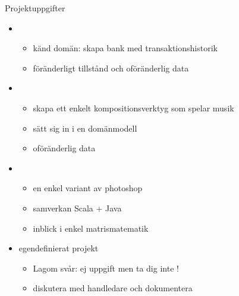 \begin{Slide}{Projektuppgifter}\SlideFontTiny

\begin{itemize}\SlideFontTiny
\item {}
\begin{itemize}\SlideFontTiny
\item känd domän: skapa bank med transaktionshistorik 
\item föränderligt tillstånd och oföränderlig data
\end{itemize}

\item {}
\begin{itemize}\SlideFontTiny
\item skapa ett enkelt kompositionsverktyg som spelar musik
\item sätt sig in i en domänmodell
\item oföränderlig data
\end{itemize}

\item {} 
\begin{itemize}\SlideFontTiny
\item en enkel variant av photoshop
\item samverkan Scala + Java
\item inblick i enkel matrismatematik
\end{itemize}


\item egendefinierat projekt 
\begin{itemize}\SlideFontTiny
\item Lagom svår: ej  uppgift men ta dig inte !
\item diskutera med handledare och dokumentera
\end{itemize}


\end{itemize}

\end{Slide}


